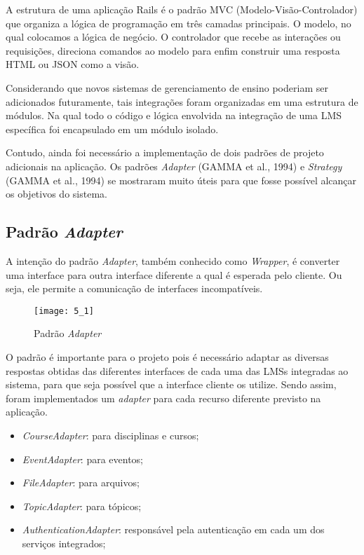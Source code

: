 A estrutura de uma aplicação Rails é o padrão MVC (Modelo-Visão-Controlador) que organiza a lógica de programação em três camadas principais. O modelo, no qual colocamos a lógica de negócio. O controlador que recebe as interações ou requisições, direciona comandos ao modelo para enfim construir uma resposta HTML ou JSON como a visão. 

Considerando que novos sistemas de gerenciamento de ensino poderiam ser adicionados futuramente, tais integrações foram organizadas em uma estrutura de módulos. Na qual todo o código e lógica envolvida na integração de uma LMS específica foi encapsulado em um módulo isolado.

Contudo, ainda foi necessário a implementação de dois padrões de projeto adicionais na aplicação. Os padrões \textit{Adapter} (GAMMA et al., 1994) e \textit{Strategy} (GAMMA et al., 1994) se mostraram muito úteis para que fosse possível alcançar os objetivos do sistema.
						
\subsection{Padrão \textit{Adapter}}

A intenção do padrão \textit{Adapter}, também conhecido como \textit{Wrapper}, é converter uma interface para outra interface diferente a qual é esperada pelo cliente. Ou seja, ele permite a comunicação de interfaces incompatíveis.	 	

\begin{figure}[H]
    \centering
\texttt{[image: 5\_1]}
    \caption{Padrão \textit{Adapter}}
    \label{figura1}
\end{figure}
			
O padrão é importante para o projeto pois é necessário adaptar as diversas respostas obtidas das diferentes interfaces de cada uma das LMSs integradas ao sistema, para que seja possível que a interface cliente os utilize. Sendo assim, foram implementados um \textit{adapter} para cada recurso diferente previsto na aplicação.

\begin{itemize}
    \item \textit{CourseAdapter}: para disciplinas e cursos;
    \item \textit{EventAdapter}: para eventos;
    \item \textit{FileAdapter}: para arquivos;
    \item \textit{TopicAdapter}: para tópicos;
    \item \textit{AuthenticationAdapter}: responsável pela autenticação em cada um dos serviços integrados;
\end{itemize}

